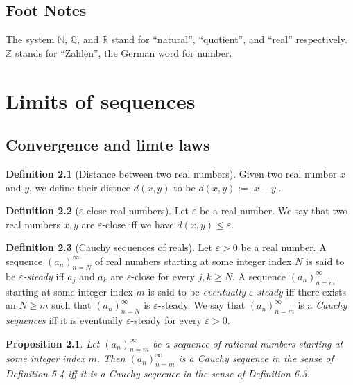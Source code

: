 \documentclass[
]{book}
\newtheorem{proposition}{Proposition}[chapter]
\theoremstyle{definition}
\newtheorem{definition}{Definition}[chapter]
\theoremstyle{definition}
\theoremstyle{definition}
\theoremstyle{definition}
\theoremstyle{remark}
\begin{document}
\section{Foot Notes}\label{foot-notes}

The system \(\mathbb{N}\), \(\mathbb{Q}\), and \(\mathbb{R}\) stand for ``natural'', ``quotient'', and ``real'' respectively. \(\mathbb{Z}\) stands for ``Zahlen'', the German word for number.

\chapter{Limits of sequences}\label{limits}

\section{Convergence and limte laws}\label{convergence-and-limte-laws}

\begin{definition}[Distance between two real numbers]
Given two real number \(x\) and \(y\), we define their distnce \(d(x,y)\) to be \(d(x,y) :=|x-y|\).
\end{definition}

\begin{definition}[$\varepsilon$-close real numbers]
Let \(\varepsilon\) be a real number. We say that two real numbers \(x,y\) are \(\varepsilon\)-close iff we have \(d(x,y)\leq \varepsilon\).
\end{definition}

\begin{definition}[Cauchy sequences of reals]
Let \(\varepsilon>0\) be a real number. A sequence \((a_n)_{n=N}^{\infty}\) of real numbers starting at some integer index \(N\) is said to be \emph{\(\varepsilon\)-steady} iff \(a_j\) and \(a_k\) are \(\varepsilon\)-close for every \(j,k\geq N\). A sequence \((a_n)_{n=m}^{\infty}\) starting at some integer index \(m\) is said to be \emph{eventually \(\varepsilon\)-steady} iff there exists an \(N\geq m\) such that \((a_n)_{n=N}^{\infty}\) is \(\varepsilon\)-steady. We say that \((a_n)_{n=m}^{\infty}\) is a \emph{Cauchy sequences} iff it is eventually \(\varepsilon\)-steady for every \(\varepsilon>0\).
\end{definition}

\begin{proposition}
Let \((a_n)_{n=m}^{\infty}\) be a sequence of rational numbers starting at some integer index \(m\). Then \((a_n)_{n=m}^{\infty}\) is a Cauchy sequence in the sense of Definition 5.4 iff it is a Cauchy sequence in the sense of Definition 6.3.
\end{proposition}
\end{document}
